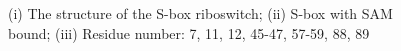 \documentclass[a4paper,10pt]{article}
\begin{document}
\begin{figure}
\caption{(i) The structure of the S-box riboswitch; (ii) S-box with SAM bound; (iii) Residue number: 7, 11, 
12, 45-47, 57-59, 88, 89}
\end{figure}
\end{document}
